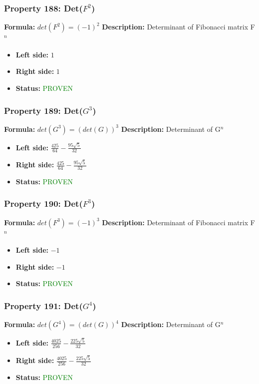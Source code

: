 \subsubsection*{Property 188: Det($F^{2}$)}
\textbf{Formula:} $det(F^2) = (-1)^2$
\textbf{Description:} Determinant of Fibonacci matrix F$^n$

\begin{itemize}
\item \textbf{Left side:} $1$
\item \textbf{Right side:} $1$
\item \textbf{Status:} \textcolor{green}{PROVEN}
\end{itemize}

\subsubsection*{Property 189: Det($G^{3}$)}
\textbf{Formula:} $det(G^3) = (det(G))^3$
\textbf{Description:} Determinant of G$^n$

\begin{itemize}
\item \textbf{Left side:} $\frac{425}{64} - \frac{95 \sqrt{5}}{32}$
\item \textbf{Right side:} $\frac{425}{64} - \frac{95 \sqrt{5}}{32}$
\item \textbf{Status:} \textcolor{green}{PROVEN}
\end{itemize}

\subsubsection*{Property 190: Det($F^{3}$)}
\textbf{Formula:} $det(F^3) = (-1)^3$
\textbf{Description:} Determinant of Fibonacci matrix F$^n$

\begin{itemize}
\item \textbf{Left side:} $-1$
\item \textbf{Right side:} $-1$
\item \textbf{Status:} \textcolor{green}{PROVEN}
\end{itemize}

\subsubsection*{Property 191: Det($G^{4}$)}
\textbf{Formula:} $det(G^4) = (det(G))^4$
\textbf{Description:} Determinant of G$^n$

\begin{itemize}
\item \textbf{Left side:} $\frac{4025}{256} - \frac{225 \sqrt{5}}{32}$
\item \textbf{Right side:} $\frac{4025}{256} - \frac{225 \sqrt{5}}{32}$
\item \textbf{Status:} \textcolor{green}{PROVEN}
\end{itemize}


